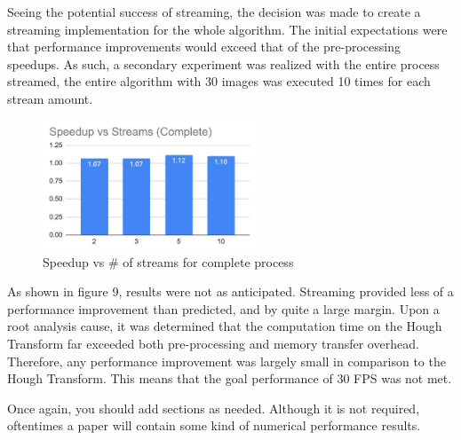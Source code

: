 \documentclass[12pt]{article}
\begin{document}
Seeing the potential success of streaming, the decision was made to create a streaming implementation for the whole algorithm. The initial expectations were that performance improvements would exceed that of the pre-processing speedups. As such, a secondary experiment was realized with the entire process streamed, the entire algorithm with 30 images was executed 10 times for each stream amount.

\begin{figure}[H]
\centering
\includegraphics[width=2.5in]{figures/StreamsComplete}\caption{Speedup vs \# of streams for complete process}\label{figure:streamComplete}
\end{figure}

As shown in figure 9, results were not as anticipated. Streaming provided less of a performance improvement than predicted, and by quite a large margin. Upon a root analysis cause, it was determined that the computation time on the Hough Transform far exceeded both pre-processing and memory transfer overhead. Therefore, any performance improvement was largely small in comparison to the Hough Transform. This means that the goal performance of 30 FPS was not met.


\noindent
Once again, you should add sections as needed. Although it is not required, oftentimes a paper will contain some kind of numerical performance results.
\end{document}
